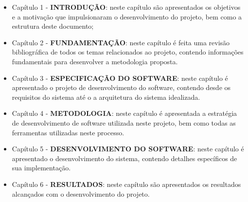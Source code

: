 \begin{itemize}
	\item Capítulo 1 - \textbf{INTRODUÇÃO}: neste capítulo são apresentados os objetivos e a motivação que impulsionaram o desenvolvimento do projeto, bem como a estrutura deste documento;

	\item Capítulo 2 - \textbf{FUNDAMENTAÇÃO}: neste capítulo é feita uma revisão bibliográfica de todos os temas relacionados ao projeto, contendo informações fundamentais para desenvolver a metodologia proposta.

	\item Capítulo 3 - \textbf{ESPECIFICAÇÃO DO SOFTWARE}: neste capítulo é apresentado o projeto de desenvolvimento do software, contendo desde os requisitos do sistema até o a arquitetura do sistema idealizada.

	\item Capítulo 4 - \textbf{METODOLOGIA}: neste capítulo é apresentada a estratégia de desenvolvimento de software utilizada neste projeto, bem como todas as ferramentas utilizadas neste processo. 

	\item Capítulo 5 - \textbf{DESENVOLVIMENTO DO SOFTWARE}: neste capítulo é apresentado o desenvolvimento do sistema, contendo detalhes específicos de sua implementação.

	\item Capítulo 6 - \textbf{RESULTADOS}: neste capítulo são apresentados os resultados alcançados com o desenvolvimento do projeto.

\end{itemize}
